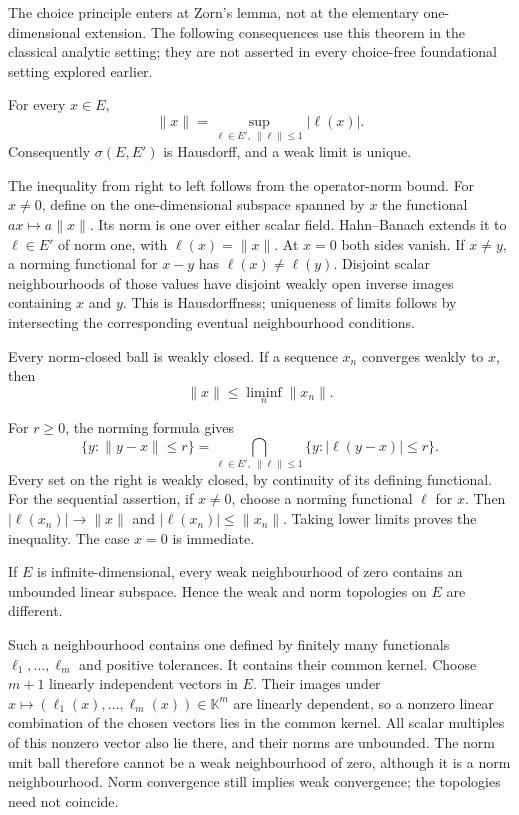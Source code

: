 The choice principle enters at Zorn's lemma, not at the elementary
one-dimensional extension. The following consequences use this theorem
in the classical analytic setting; they are not asserted in every
choice-free foundational setting explored earlier.

\begin{proposition}
For every $x\in E$,
\[
\|x\|=\sup_{\ell\in E',\ \|\ell\|\leqslant1}|\ell(x)|.
\]
Consequently $\sigma(E,E')$ is Hausdorff, and a weak limit is unique.
\end{proposition}
\Proof
The inequality from right to left follows from the operator-norm bound.
For $x\ne0$, define on the one-dimensional subspace spanned by $x$
the functional $a x\mapsto a\|x\|$. Its norm is one over either
scalar field. Hahn--Banach extends it to $\ell\in E'$ of norm one,
with $\ell(x)=\|x\|$. At $x=0$ both sides vanish.
If $x\ne y$, a norming functional for $x-y$ has
$\ell(x)\ne\ell(y)$. Disjoint scalar neighbourhoods of those values
have disjoint weakly open inverse images containing $x$ and $y$.
This is Hausdorffness; uniqueness of limits follows by intersecting
the corresponding eventual neighbourhood conditions.
\Done

\begin{corollary}
Every norm-closed ball is weakly closed. If a sequence $x_n$ converges
weakly to $x$, then
\[
\|x\|\leqslant\liminf_n\|x_n\|.
\]
\end{corollary}
\Proof
For $r\geqslant0$, the norming formula gives
\[
\{y:\|y-x\|\leqslant r\}
=\bigcap_{\ell\in E',\ \|\ell\|\leqslant1}
 \{y:|\ell(y-x)|\leqslant r\}.
\]
Every set on the right is weakly closed, by continuity of its defining
functional. For the sequential assertion, if $x\ne0$, choose a norming
functional $\ell$ for $x$. Then
$|\ell(x_n)|\to\|x\|$ and $|\ell(x_n)|\leqslant\|x_n\|$.
Taking lower limits proves the inequality. The case $x=0$ is immediate.
\Done

\begin{proposition}
If $E$ is infinite-dimensional, every weak neighbourhood of zero
contains an unbounded linear subspace. Hence the weak and norm
topologies on $E$ are different.
\end{proposition}
\Proof
Such a neighbourhood contains one defined by finitely many functionals
$\ell_1,\ldots,\ell_m$ and positive tolerances. It contains their common
kernel. Choose $m+1$ linearly independent vectors in $E$. Their images
under $x\mapsto(\ell_1(x),\ldots,\ell_m(x))\in\mathbb K^m$ are linearly
dependent, so a nonzero linear combination of the chosen vectors lies
in the common kernel. All scalar multiples of this nonzero vector
also lie there, and their norms are unbounded. The norm unit ball
therefore cannot be a weak neighbourhood of zero, although it is a
norm neighbourhood. Norm convergence still implies weak convergence;
the topologies need not coincide.
\Done

